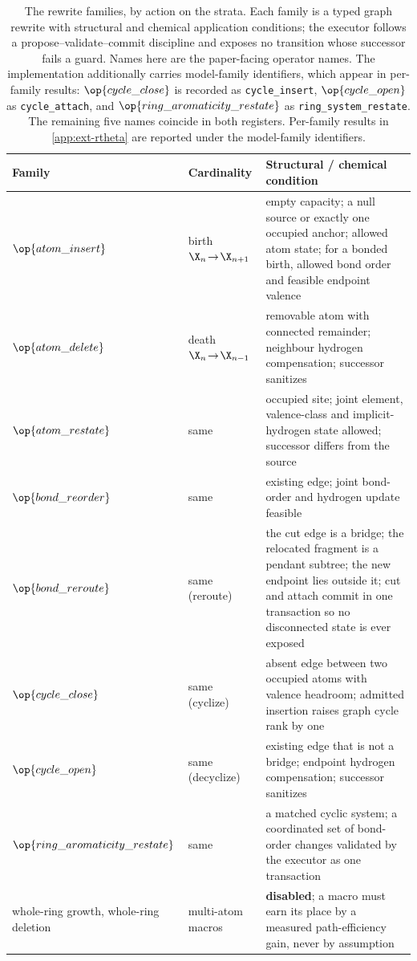 \begin{table}[h]
\centering
\small
\caption{The rewrite families, by action on the strata. Each family is a typed graph rewrite with structural and chemical application conditions; the executor follows a propose--validate--commit discipline and exposes no transition whose successor fails a guard. Names here are the paper-facing operator names. The implementation additionally carries model-family identifiers, which appear in per-family results: $\op{cycle\_close}$ is recorded as \texttt{cycle\_insert}, $\op{cycle\_open}$ as \texttt{cycle\_attach}, and $\op{ring\_aromaticity\_restate}$ as \texttt{ring\_system\_restate}. The remaining five names coincide in both registers. Per-family results in \cref{app:ext-rtheta} are reported under the model-family identifiers.}
\label{tab:operators}
\begin{tabularx}{\textwidth}{@{}llY@{}}
\toprule
Family & Cardinality & Structural / chemical condition\\
\midrule
$\op{atom\_insert}$ & birth $\X_n\!\to\!\X_{n+1}$ & empty capacity; a null source or exactly one occupied anchor; allowed atom state; for a bonded birth, allowed bond order and feasible endpoint valence\\
$\op{atom\_delete}$ & death $\X_n\!\to\!\X_{n-1}$ & removable atom with connected remainder; neighbour hydrogen compensation; successor sanitizes\\
$\op{atom\_restate}$ & same & occupied site; joint element, valence-class and implicit-hydrogen state allowed; successor differs from the source\\
$\op{bond\_reorder}$ & same & existing edge; joint bond-order and hydrogen update feasible\\
$\op{bond\_reroute}$ & same (reroute) & the cut edge is a bridge; the relocated fragment is a pendant subtree; the new endpoint lies outside it; cut and attach commit in one transaction so no disconnected state is ever exposed\\
$\op{cycle\_close}$ & same (cyclize) & absent edge between two occupied atoms with valence headroom; admitted insertion raises graph cycle rank by one\\
$\op{cycle\_open}$ & same (decyclize) & existing edge that is not a bridge; endpoint hydrogen compensation; successor sanitizes\\
$\op{ring\_aromaticity\_restate}$ & same & a matched cyclic system; a coordinated set of bond-order changes validated by the executor as one transaction\\
\midrule
whole-ring growth, whole-ring deletion & multi-atom macros & \textbf{disabled}; a macro must earn its place by a measured path-efficiency gain, never by assumption\\
\bottomrule
\end{tabularx}
\end{table}

